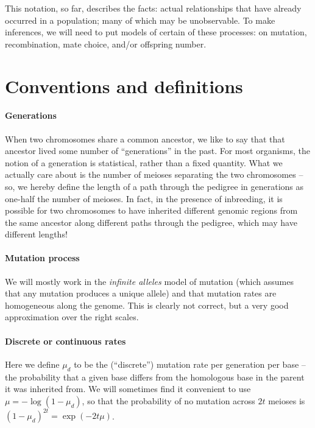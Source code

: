 This notation, so far, describes the facts:
actual relationships that have already occurred in a population;
many of which may be unobservable.
To make inferences, we will need to put models of certain of these processes:
on mutation, recombination, mate choice, and/or offspring number.


\section{Conventions and definitions}

\paragraph{Generations}
  When two chromosomes share a common ancestor, we like to say that that ancestor lived some number of ``generations'' in the past.
  For most organisms, the notion of a generation is statistical, rather than a fixed quantity.
  What we actually care about is the number of meioses separating the two chromosomes --
  so, we hereby define the length of a path through the pedigree in generations as one-half the number of meioses.
  In fact, in the presence of inbreeding, it is possible for two chromosomes to have inherited different genomic regions
  from the same ancestor along different paths through the pedigree, which may have different lengths!

\paragraph{Mutation process}
  We will mostly work in the \emph{infinite alleles} model of mutation
  (which assumes that any mutation produces a unique allele)
  and that mutation rates are homogeneous along the genome.
  This is clearly not correct, but a very good approximation over the right scales.


\paragraph{Discrete or continuous rates}
  Here we define $\mu_d$ to be the (``discrete'') mutation rate per generation per base 
  -- the probability that a given base differs from the homologous base in the parent it was inherited from.
  We will sometimes find it convenient to use $\mu = -\log(1-\mu_d)$,
  so that the probability of no mutation across $2t$ meioses is $(1-\mu_d)^{2t} = \exp(-2 t \mu )$.

